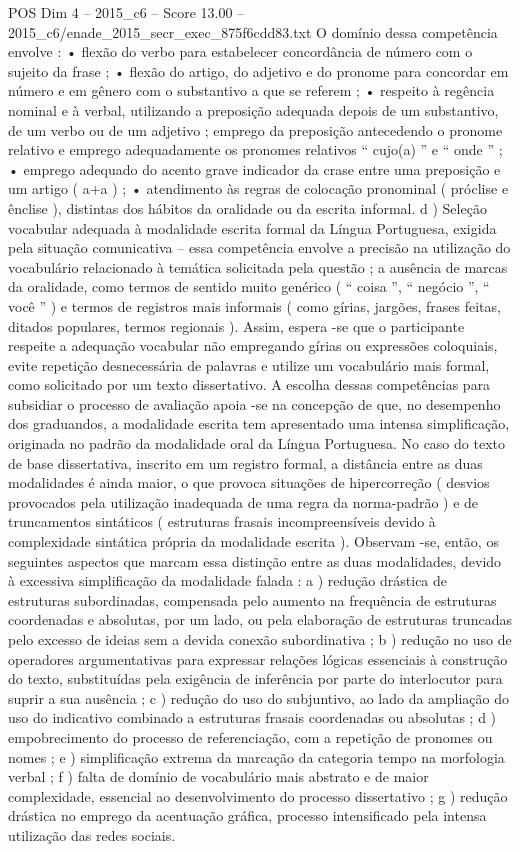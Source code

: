 \begin{textsample}{POS Dim 4 – 2015\_c6 – Score 13.00 – 2015\_c6/enade\_2015\_secr\_exec\_875f6cdd83.txt}
O domínio dessa competência envolve : • flexão do verbo para estabelecer concordância de número com o sujeito da frase ; • flexão do artigo, do adjetivo e do pronome para concordar em número e em gênero com o substantivo a que se referem ; • respeito à regência nominal e à verbal, utilizando a preposição adequada depois de um substantivo, de um verbo ou de um adjetivo ; emprego da preposição antecedendo o pronome relativo e emprego adequadamente os pronomes relativos “ cujo(a) ” e “ onde ” ; • emprego adequado do acento grave indicador da crase entre uma preposição e um artigo ( a+a ) ; • atendimento às regras de colocação pronominal ( próclise e ênclise ), distintas dos hábitos da oralidade ou da escrita informal. d ) Seleção vocabular adequada à modalidade escrita formal da Língua Portuguesa, exigida pela situação comunicativa – essa competência envolve a precisão na utilização do vocabulário relacionado à temática solicitada pela questão ; a ausência de marcas da oralidade, como termos de sentido muito genérico ( “ coisa ”, “ negócio ”, “ você ” ) e termos de registros mais informais ( como gírias, jargões, frases feitas, ditados populares, termos regionais ).
Assim, espera -se que o participante respeite a adequação vocabular não empregando gírias ou expressões coloquiais, evite repetição desnecessária de palavras e utilize um vocabulário mais formal, como solicitado por um texto dissertativo.
A escolha dessas competências para subsidiar o processo de avaliação apoia -se na concepção de que, no desempenho dos graduandos, a modalidade escrita tem apresentado uma intensa simplificação, originada no padrão da modalidade oral da Língua Portuguesa.
No caso do texto de base dissertativa, inscrito em um registro formal, a distância entre as duas modalidades é ainda maior, o que provoca situações de hipercorreção ( desvios provocados pela utilização inadequada de uma regra da norma-padrão ) e de truncamentos sintáticos ( estruturas frasais incompreensíveis devido à complexidade sintática própria da modalidade escrita ).
Observam -se, então, os seguintes aspectos que marcam essa distinção entre as duas modalidades, devido à excessiva simplificação da modalidade falada : a ) redução drástica de estruturas subordinadas, compensada pelo aumento na frequência de estruturas coordenadas e absolutas, por um lado, ou pela elaboração de estruturas truncadas pelo excesso de ideias sem a devida conexão subordinativa ; b ) redução no uso de operadores argumentativas para expressar relações lógicas essenciais à construção do texto, substituídas pela exigência de inferência por parte do interlocutor para suprir a sua ausência ; c ) redução do uso do subjuntivo, ao lado da ampliação do uso do indicativo combinado a estruturas frasais coordenadas ou absolutas ; d ) empobrecimento do processo de referenciação, com a repetição de pronomes ou nomes ; e ) simplificação extrema da marcação da categoria tempo na morfologia verbal ; f ) falta de domínio de vocabulário mais abstrato e de maior complexidade, essencial ao desenvolvimento do processo dissertativo ; g ) redução drástica no emprego da acentuação gráfica, processo intensificado pela intensa utilização das redes sociais.

\end{textsample}
